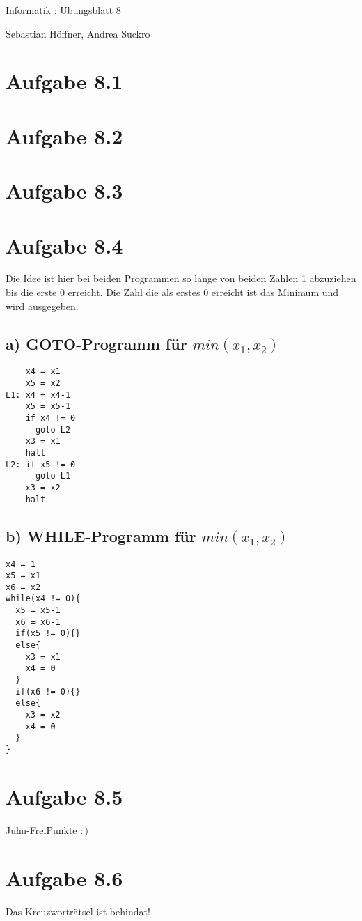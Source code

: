 \documentclass{article}
\begin{document}
\begin{center}
  \Large{Informatik \revD: Übungsblatt 8}

  \large{Sebastian Höffner, Andrea Suckro}
\end{center}



\section*{Aufgabe 8.1}
\section*{Aufgabe 8.2}
\section*{Aufgabe 8.3}
\section*{Aufgabe 8.4}
Die Idee ist hier bei beiden Programmen so lange von beiden Zahlen 1 abzuziehen bis die erste 0 erreicht. Die Zahl die als erstes 0 erreicht ist das Minimum und wird ausgegeben.
\subsection*{a) GOTO-Programm für $min(x_1,x_2)$}
\begin{verbatim}
    x4 = x1
    x5 = x2
L1: x4 = x4-1
    x5 = x5-1
    if x4 != 0
      goto L2
    x3 = x1
    halt
L2: if x5 != 0
      goto L1
    x3 = x2
    halt
\end{verbatim}
\subsection*{b) WHILE-Programm für $min(x_1,x_2)$}
\begin{verbatim}
x4 = 1
x5 = x1
x6 = x2
while(x4 != 0){
  x5 = x5-1
  x6 = x6-1
  if(x5 != 0){}
  else{
    x3 = x1
    x4 = 0
  }
  if(x6 != 0){}
  else{
    x3 = x2
    x4 = 0
  }
}
\end{verbatim}
\section*{Aufgabe 8.5}
Juhu-FreiPunkte $:)$
\section*{Aufgabe 8.6}
Das Kreuzworträtsel ist behindat!
\end{document}
